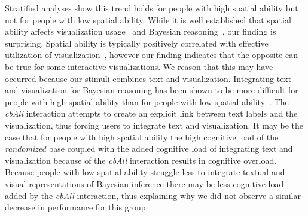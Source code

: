 Stratified analyses show this trend holds for people with high spatial ability but not for people with low spatial ability. While it is well established that spatial ability affects visualization usage~\cite{liu2020Survey} and Bayesian reasoning~\cite{ottley2016Bayesian}, our finding is surprising.
Spatial ability is typically positively correlated with effective utilization of visualization~\cite{liu2020Survey}, however our finding indicates that the opposite can be true for some interactive visualizations. We reason that this may have occurred 
because our stimuli combines text and visualization. Integrating text and visualization for Bayesian reasoning has been shown to be more difficult for people with high spatial ability than for people with low spatial ability~\cite{ottley2016Bayesian}. The \textit{cbAll} interaction attempts to create an explicit link between text labels and the visualization, thus forcing users to integrate text and visualization. It may be the case that for people with high spatial ability the high cognitive load of the \textit{randomized} base coupled with the added cognitive load of integrating text and visualization because of the \textit{cbAll} interaction results in cognitive overload. Because people with low spatial ability struggle less to integrate textual and visual representations of Bayesian inference there may be less cognitive load added by the \textit{cbAll} interaction, thus explaining why we did not observe a similar decrease in performance for this group.  


